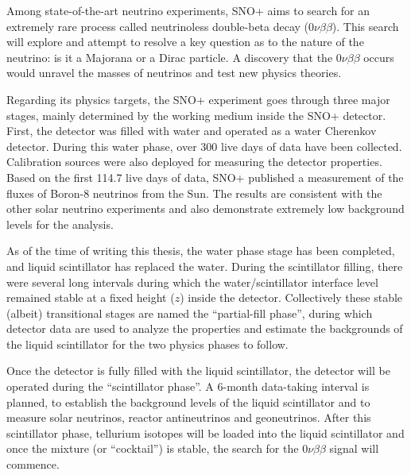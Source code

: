 
Among state-of-the-art neutrino experiments, SNO+ aims to search for an extremely rare process called neutrinoless double-beta decay ($0\nu\beta\beta$). This search will explore and attempt to resolve a key question as to the nature of the neutrino: is it a Majorana or a Dirac particle. A discovery that the $0\nu\beta\beta$ occurs would unravel the masses of neutrinos and test new physics theories.

Regarding its physics targets, the SNO+ experiment goes through three major stages, mainly determined by the working medium inside the SNO+ detector. First, the detector was filled with water and operated as a water Cherenkov detector. During this water phase, over 300 live days of data have been collected. Calibration sources were also deployed for measuring the detector properties. Based on the first 114.7 live days of data, SNO+ published a measurement of the fluxes of Boron-8 neutrinos from the Sun. The results are consistent with the other solar neutrino experiments and also demonstrate extremely low background levels for the analysis\cite{anderson2019measurement}.

As of the time of writing this thesis, the water phase stage has been completed, and liquid scintillator has replaced the water. During the scintillator filling, there were several long intervals during which the water/scintillator interface level remained stable at a fixed height ($z$) inside the detector. Collectively these stable (albeit) transitional stages are named the ``partial-fill phase'', during which detector data are used to analyze the properties and estimate the backgrounds of the liquid scintillator for the two physics phases to follow.

Once the detector is fully filled with the liquid scintillator, the detector will be operated during the ``scintillator phase''. A 6-month data-taking interval is planned, to establish the background levels of the liquid scintillator and to measure solar neutrinos, reactor antineutrinos and geoneutrinos\cite{directorReview}. After this scintillator phase, tellurium isotopes will be loaded into the liquid scintillator and once the mixture (or ``cocktail'') is stable, the search for the $0\nu\beta\beta$ signal will commence.

